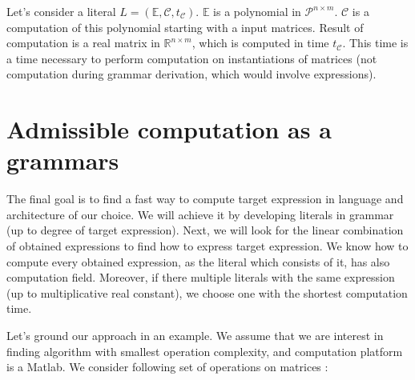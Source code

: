 \documentclass{article}
\begin{document}
Let's consider a literal $L = (\mathbb{E}, \mathcal{C}, t_\mathcal{C})$. $\mathbb{E}$ is a polynomial in $\mathcal{P}^{n \times m}$. $\mathcal{C}$ is a computation of this polynomial starting with a input matrices. Result of computation is a real matrix
in $\mathbb{R}^{n \times m}$, which is computed in time $t_\mathcal{C}$. This time is a time necessary to perform computation on instantiations of matrices (not computation during grammar derivation, which would involve expressions).

\section{Admissible computation as a grammars}\label{sec:grammars}

The final goal is to find a fast way to compute target expression in language and architecture of our choice.
We will achieve it by developing literals in grammar (up to degree of target expression). Next, we
will look for the linear combination of obtained expressions to find how to express target expression.
We know how to compute every obtained expression, as the literal which consists of it, has also computation field.
Moreover, if there multiple literals with the same expression (up to multiplicative real constant), we 
choose one with the shortest computation time.


Let's ground our approach in an example. We assume that we are interest in
finding algorithm with smallest operation complexity, and computation platform
is a Matlab.  We consider following set of operations on matrices : 
\end{document}
